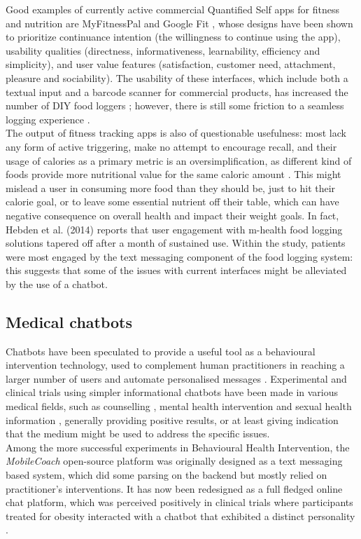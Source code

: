 Good examples of currently active commercial Quantified Self apps for fitness and nutrition are MyFitnessPal \cite{mfpwebsite} and Google Fit \cite{googlefitwebsite}, whose designs have been shown \cite{Suzianti2017} to prioritize continuance intention (the willingness to continue using the app), usability qualities (directness, informativeness, learnability, efficiency and simplicity), and user value features (satisfaction, customer need, attachment, pleasure and sociability). The usability of these interfaces, which include both a textual input and a barcode scanner for commercial products, has increased the number of DIY food loggers \cite{Alonso2015}; however, there is still some friction to a seamless logging experience \cite{Boushey2016}. \\
The output of fitness tracking apps is also of questionable usefulness: most lack any form of active triggering, make no attempt to encourage recall, and their usage of calories as a primary metric is an oversimplification, as different kind of foods provide more nutritional value for the same caloric amount \cite{webmdcalories}. This might mislead a user in consuming more food than they should be, just to hit their calorie goal, or to leave some essential nutrient off their table, which can have negative consequence on overall health and impact their weight goals. In fact, Hebden et al. (2014)\cite{hebden2014} reports that user engagement with m-health food logging solutions tapered off after a month of sustained use. Within the study, patients were most engaged by the text messaging component of the food logging system: this suggests that some of the issues with current interfaces might be alleviated by the use of a chatbot. 
\subsection{Medical chatbots} 
Chatbots have been speculated to provide a useful tool as a behavioural intervention technology, used to complement human practitioners in reaching a larger number of users and automate personalised messages \cite{Gabrielli2017}. Experimental and clinical trials using simpler informational chatbots have been made in various medical fields, such as counselling \cite{Cameron}, mental health intervention \cite{Elmasri2012} and sexual health information \cite{Brixey2017}, generally providing positive results, or at least giving indication that the medium might be used to address the specific issues. \\
Among the more successful experiments in Behavioural Health Intervention, the \textit{MobileCoach} open-source platform \cite{mobilecoacheu} was originally designed as a text messaging based system, which did some parsing on the backend but mostly relied on practitioner's interventions. It has now been redesigned as a full fledged online chat platform, which was perceived positively in clinical trials where participants treated for obesity interacted with a chatbot that exhibited a distinct personality \cite{Kowatsch2017}.

